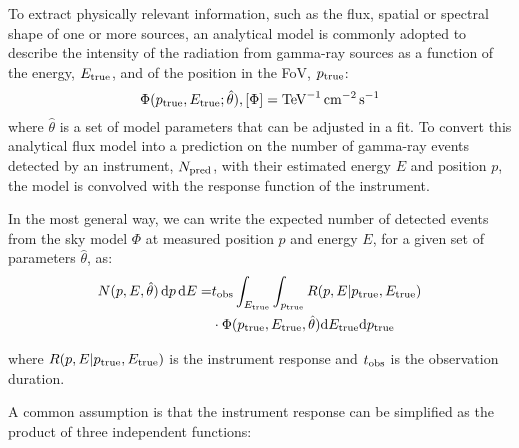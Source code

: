 \documentclass[longauth]{aa}
\begin{document}

To extract physically relevant information, such as the flux, spatial or spectral shape of one or more sources,
an analytical model is commonly adopted to describe the intensity of the radiation from gamma-ray sources
as a function of the energy, $E_{\rm true}$, and of the position in the FoV, $p_{\rm true}$:
\begin{equation}
    \Phi(p_{\rm true}, E_{\rm true}; \hat{\theta}), [\Phi] = \si{TeV^{-1}.cm^{-2}.s^{-1}}
    \label{eq:general_source_model}
\end{equation}
where $\hat{\theta}$ is a set of model parameters that can be adjusted in a fit. To convert this analytical flux model
into a prediction on the number of gamma-ray events detected by an instrument, $N_{\rm pred}$,
with their estimated energy $E$ and position $p$, the model is convolved with the response function of the instrument.


In the most general way, we can write the expected number of detected events from the sky model $\Phi$ at measured position $p$ and energy $E$, for
a given set of parameters $\hat{\theta}$, as:
%
\begin{equation}
	\begin{split}
   		N(p, E, \hat{\theta})\,{\rm d}p\,{\rm d}E = &t_{\rm obs} \int_{E_{\rm true}} \int_{p_{\rm true}}  R(p, E|p_{\rm true}, E_{\rm true}) \\
   		&\cdot \Phi(p_{\rm true}, E_{\rm true}, \hat{\theta} ) {\rm d}E_{\rm true} {\rm d}p_{\rm true}
	\end{split}
\end{equation}

where $R(p, E| p_{\rm true}, E_{\rm true})$ is the instrument response and $t_{\rm obs}$ is the observation duration.

A common assumption is that the instrument response can be simplified as the product
of three independent functions:
\end{document}
